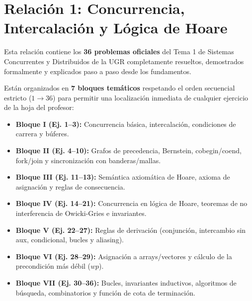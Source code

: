 \chapter{Relación 1: Concurrencia, Intercalación y Lógica de Hoare}
\label{cap:relacion1}


\begin{aviso}
Esta relación contiene los \textbf{36 problemas oficiales} del Tema 1 de Sistemas Concurrentes y Distribuidos de la UGR completamente resueltos, demostrados formalmente y explicados paso a paso desde los fundamentos. 

Están organizados en \textbf{7 bloques temáticos} respetando el orden secuencial estricto ($1 \to 36$) para permitir una localización inmediata de cualquier ejercicio de la hoja del profesor:
\begin{itemize}[leftmargin=*,noitemsep]
    \item \textbf{Bloque I (Ej. 1--3):} Concurrencia básica, intercalación, condiciones de carrera y búferes.
    \item \textbf{Bloque II (Ej. 4--10):} Grafos de precedencia, Bernstein, cobegin/coend, fork/join y sincronización con banderas/mallas.
    \item \textbf{Bloque III (Ej. 11--13):} Semántica axiomática de Hoare, axioma de asignación y reglas de consecuencia.
    \item \textbf{Bloque IV (Ej. 14--21):} Concurrencia en lógica de Hoare, teoremas de no interferencia de Owicki-Gries e invariantes.
    \item \textbf{Bloque V (Ej. 22--27):} Reglas de derivación (conjunción, intercambio sin aux, condicional, bucles y aliasing).
    \item \textbf{Bloque VI (Ej. 28--29):} Asignación a arrays/vectores y cálculo de la precondición más débil ($wp$).
    \item \textbf{Bloque VII (Ej. 30--36):} Bucles, invariantes inductivos, algoritmos de búsqueda, combinatorios y función de cota de terminación.
\end{itemize}
\end{aviso}

